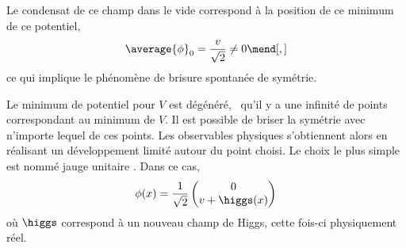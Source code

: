 \par Le condensat de ce champ dans le vide correspond à la position de ce minimum de ce potentiel,
\begin{equation}
\average{\phi}_0 = \frac{v}{\sqrt{2}} \neq 0
\mend[,]
\end{equation}
ce qui implique le phénomène de brisure spontanée de symétrie.
\par
Le minimum de potentiel pour $V$ est dégénéré, \ie\ qu'il y a une infinité de points correspondant au minimum de $V$.
Il est possible de briser la symétrie avec n'importe lequel de ces points.
Les observables physiques s'obtiennent alors en réalisant un développement limité autour du point choisi.
Le choix le plus simple est nommé \og jauge unitaire \fg.
Dans ce cas, %
\begin{equation}
\phi(x)
=
\frac{1}{\sqrt{2}}
\begin{pmatrix}
0 \\ v + \higgs(x)
\end{pmatrix}
\label{eq-phi_after_SSB}
\end{equation}
où $\higgs$ correspond à un nouveau champ de Higgs, cette fois-ci physiquement réel.%
